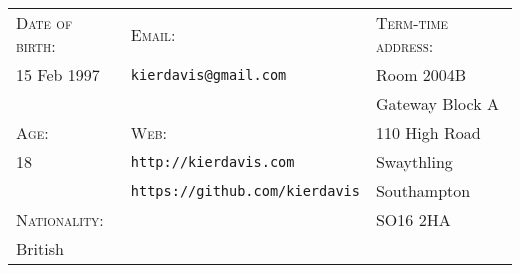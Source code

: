 \hrulefill
\vspace{1.1em}

{
\newcommand{\h}[1]{\textsc{#1}:}
\newcommand{\n}[1]{\hspace{.8em} #1}
\begin{tabu} to \textwidth {X[1,l] X[2,l] X[1.5,l]}
    \h{Date of birth}  & \h{Email}                                 & \h{Term-time address}    \\
    \n{15 Feb 1997}    & \n{\texttt{kierdavis@gmail.com}}          & \n{Room 2004B}           \\
                       &                                           & \n{Gateway Block A} \\
    \h{Age}            & \h{Web}                                   & \n{110 High Road}        \\
    \n{18}             & \n{\texttt{http://kierdavis.com}}         & \n{Swaythling}           \\
                       & \n{\texttt{https://github.com/kierdavis}} & \n{Southampton}          \\
    \h{Nationality}    &                                           & \n{SO16 2HA}             \\
    \n{British}        &                                           &                          \\
\end{tabu}
}

\hrulefill
